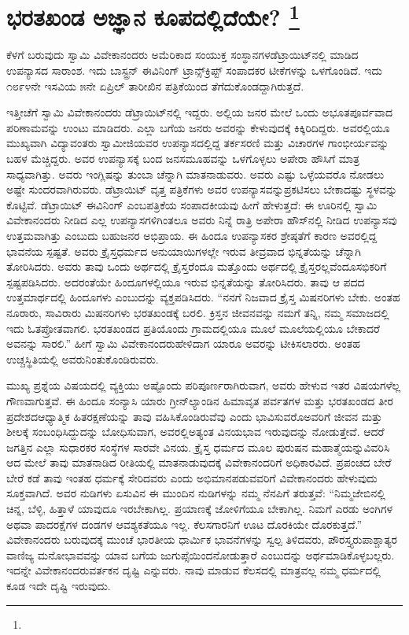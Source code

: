 
\chapter[ಭರತಖಂಡ ಅಜ್ಞಾನ ಕೂಪದಲ್ಲಿದೆಯೇ? ]{ಭರತಖಂಡ ಅಜ್ಞಾನ ಕೂಪದಲ್ಲಿದೆಯೇ? \protect\footnote{}}

ಕೆಳಗೆ ಬರುವುದು ಸ್ವಾಮಿ ವಿವೇಕಾನಂದರು ಅಮೆರಿಕಾದ ಸಂಯುಕ್ತ ಸಂಸ್ಥಾನಗಳ\break ಡೆಟ್ರಾಯಿಟ್​ನಲ್ಲಿ ಮಾಡಿದ ಉಪನ್ಯಾಸದ ಸಾರಾಂಶ. ಇದು ಬಾಸ್ಟ್ರನ್​ ಈವಿನಿಂಗ್​ ಟ್ರಾನ್ಸ್​ಕ್ರಿಪ್ಟ್ ​ಸಂಪಾದಕರ ಟೀಕೆಗಳನ್ನು ಒಳಗೊಂಡಿದೆ. ಇದು ೧೮೯೪ನೇ ಇಸವಿಯ ೫ನೇ ಏಪ್ರಿಲ್​ ತಾರೀಖಿನ ಪತ್ರಿಕೆಯಿಂದ ತೆಗೆದುಕೊಂಡದ್ದಾಗಿರುತ್ತದೆ.

ಇತ್ತೀಚೆಗೆ ಸ್ವಾಮಿ ವಿವೇಕಾನಂದರು ಡೆಟ್ರಾಯಿಟ್​ನಲ್ಲಿ ಇದ್ದರು. ಅಲ್ಲಿಯ ಜನರ ಮೇಲೆ ಒಂದು ಅಭೂತಪೂರ್ವವಾದ ಪರಿಣಾಮವನ್ನು ಉಂಟು ಮಾಡಿದರು. ಎಲ್ಲಾ ಬಗೆಯ ಜನರು ಅವರನ್ನು ಕೇಳುವುದಕ್ಕೆ ಕಿಕ್ಕಿರಿದಿದ್ದರು. ಅವರಲ್ಲಿಯೂ ಮುಖ್ಯವಾಗಿ ವಿದ್ಯಾವಂತರು ಸ್ವಾಮೀಜಿಯವರ ಉಪನ್ಯಾಸದಲ್ಲಿದ್ದ ತರ್ಕಸರಣಿ ಮತ್ತು ವಿಚಾರಗಳ ಗಾಂಭೀರ್ಯವನ್ನು ಬಹಳ ಮೆಚ್ಚಿದ್ದರು. ಅವರ ಉಪನ್ಯಾಸಕ್ಕೆ ಬಂದ ಜನಸಮೂಹವನ್ನು ಒಳಗೊಳ್ಳಲು ಅಪೇರಾ ಹೌಸಿಗೆ ಮಾತ್ರ ಸಾಧ್ಯವಾಗಿತ್ತು. ಅವರು ಇಂಗ್ಲಿಷನ್ನು ತುಂಬಾ ಚೆನ್ನಾಗಿ ಮಾತನಾಡುವರು. ಅವರು ಎಷ್ಟು ಒಳ್ಳೆಯವರೊ ನೋಡಲು ಅಷ್ಟೇ ಸುಂದರವಾಗಿರುವರು. ಡೆಟ್ರಾಯಿಟ್​ ವೃತ್ತ ಪತ್ರಿಕೆಗಳು ಅವರ ಉಪನ್ಯಾಸವನ್ನು\break ಪ್ರಕಟಿಸಲು ಬೇಕಾದಷ್ಟು ಸ್ಥಳವನ್ನು ಕೊಟ್ಟಿವೆ. ಡೆಟ್ರಾಯಿಟ್​ ಈವಿನಿಂಗ್​ ಎಂಬ\break ಪತ್ರಿಕೆಯ ಸಂಪಾದಕೀಯವು ಹೀಗೆ ಹೇಳುತ್ತದೆ: ಈ ಊರಿನಲ್ಲಿ ಸ್ವಾಮಿ ವಿವೇಕಾನಂದರು ನೀಡಿದ ಎಲ್ಲ ಉಪನ್ಯಾಸಗಳಿಗಿಂತಲೂ ಅವರು ನಿನ್ನೆ ರಾತ್ರಿ ಅಪೇರಾ ಹೌಸ್​ನಲ್ಲಿ ನೀಡಿದ ಉಪನ್ಯಾಸವು ಉತ್ತಮವಾಗಿತ್ತು ಎಂಬುದು ಬಹುಜನರ ಅಭಿಪ್ರಾಯ. ಈ ಹಿಂದೂ ಉಪನ್ಯಾಸಕರ ಶ್ರೇಷ್ಠತೆಗೆ ಕಾರಣ ಅವರಲ್ಲಿದ್ದ ಭಾವನೆಯ ಸ್ಪಷ್ಟತೆ. ಅವರು ಕ್ರೈಸ್ತಧರ್ಮದ ಅನುಯಾಯಿಗಳಲ್ಲೇ ಇರುವ ತೀವ್ರವಾದ ಭಿನ್ನತೆಯನ್ನು ಚೆನ್ನಾಗಿ ತೋರಿಸಿದರು. ಅವರು ತಾವು ಒಂದು ಅರ್ಥದಲ್ಲಿ ಕ್ರೈಸ್ತರೆಂದೂ ಮತ್ತೊಂದು ಅರ್ಥದಲ್ಲಿ ಕ್ರೈಸ್ತರಲ್ಲವೆಂದೂ\break ಸಭಿಕರಿಗೆ ಸ್ಪಷ್ಟಪಡಿಸಿದರು. ಅದರಂತೆಯೇ ಹಿಂದೂಗಳಲ್ಲಿಯೂ ಇರುವ ಭಿನ್ನತೆಯನ್ನು ತೋರಿಸಿದರು. ತಾವು ಆ ಪದದ ಉತ್ತಮಾರ್ಥದಲ್ಲಿ ಹಿಂದೂಗಳು ಎಂಬುದನ್ನು ವ್ಯಕ್ತಪಡಿಸಿದರು. “ನನಗೆ ನಿಜವಾದ ಕ್ರೈಸ್ತ ಮಿಷನರಿಗಳು ಬೇಕು. ಅಂತಹ ನೂರಾರು, ಸಾವಿರಾರು ಮಿಷನರಿಗಳು ಭರತಖಂಡಕ್ಕೆ ಬರಲಿ. ಕ್ರಿಸ್ತನ ಜೀವನವನ್ನು ನಮಗೆ ತನ್ನಿ, ನಮ್ಮ ಸಮಾಜದಲ್ಲಿ ಇದು ಓತಪ್ರೋತವಾಗಲಿ. ಭರತಖಂಡದ ಪ್ರತಿಯೊಂದು ಗ್ರಾಮದಲ್ಲಿಯೂ ಮೂಲೆ ಮೂಲೆಯಲ್ಲಿಯೂ ಬೇಕಾದರೆ ಅವನನ್ನು ಸಾರಲಿ.” ಹೀಗೆ ಸ್ವಾಮಿ ವಿವೇಕಾನಂದರು\break ಹೇಳಿದಾಗ ಯಾರೂ ಅವರನ್ನು ಟೀಕಿಸಲಾರರು. ಅಂತಹ ಉಚ್ಚಸ್ಥಿತಿಯಲ್ಲಿ ಅವರು\break ನಿಂತುಕೊಂಡಿರುವರು.

ಮುಖ್ಯ ಪ್ರಶ್ನೆಯ ವಿಷಯದಲ್ಲಿ ವ್ಯಕ್ತಿಯು ಅಷ್ಟೊಂದು ಪರಿಪೂರ್ಣರಾಗಿರುವಾಗ, ಅವರು ಹೇಳುವ ಇತರ ವಿಷಯಗಳೆಲ್ಲ ಗೌಣವಾಗುತ್ತವೆ. ಈ ಹಿಂದೂ ಸಂನ್ಯಾಸಿ ಯಾರು ಗ್ರೀನ್​ಲ್ಯಾಂಡಿನ ಹಿಮಾವೃತ ಪರ್ವತಗಳ ಮತ್ತು ಭರತಖಂಡದ ತೀರ ಪ್ರದೇಶದ\break ಆಧ್ಯಾತ್ಮಿಕ ಹಿತರಕ್ಷಣೆಯನ್ನು ತಾವು ವಹಿಸಿಕೊಂಡಿರುವೆವು ಎಂದು ಭಾವಿಸುವರೊ\break ಅವರಿಗೆ ಜೀವನ ಮತ್ತು ಶೀಲಕ್ಕೆ ಸಂಬಂಧಿಸಿದ್ದುದನ್ನು ಬೋಧಿಸುವಾಗ, ಅವರಲ್ಲಿ\break ಅತ್ಯಂತ ವಿನಯಭಾವ ಇರುವುದನ್ನು ನೋಡುತ್ತೇವೆ. ಆದರೆ ಜಗತ್ತಿನ ಎಲ್ಲಾ ಸುಧಾರಕರ ಸಂಸ್ಥೆಗಳ ಸಾರವೇ ವಿನಯ. ಕ್ರೈಸ್ತ ಧರ್ಮದ ಮೂಲ ಪುರುಷನ ಮಹಾತ್ಮೆಯನ್ನು\break ವಿವರಿಸಿ ಆದ ಮೇಲೆ ತಾವು ಮಾತನಾಡಿದ ರೀತಿಯಲ್ಲಿ ಮಾತನಾಡುವುದಕ್ಕೆ ವಿವೇಕಾನಂದ\-ರಿಗೆ ಅಧಿಕಾರವಿದೆ. ಪ್ರಪಂಚದ ಬೇರೆ ಬೇರೆ ಕಡೆ ತಾವು ಇಂತಹ ಧರ್ಮಕ್ಕೆ ಸೇರಿದವರು ಎಂದು ಅಭಿಮಾನಪಡುವವರಿಗೆ ವಿವೇಕಾನಂದರು ಹೇಳುವುದು ಸೂಕ್ತವಾಗಿದೆ. ಅವರ ನುಡಿಗಳು ಏಸುವಿನ ಈ ಮುಂದಿನ ನುಡಿಗಳನ್ನು ನಮ್ಮ ನೆನಪಿಗೆ ತರುತ್ತವೆ: “ನಿಮ್ಮ\break ಜೇಬಿನಲ್ಲಿ ಚಿನ್ನ, ಬೆಳ್ಳಿ, ಹಿತ್ತಾಳೆ ಯಾವುದೂ ಇರಬೇಕಾಗಿಲ್ಲ. ಪ್ರಯಾಣಕ್ಕೆ ಜೋಳಿಗೆಯೂ ಬೇಕಾಗಿಲ್ಲ. ನಿಮಗೆ ಎರಡು ಅಂಗಿಗಳ ಅಥವಾ ಪಾದರಕ್ಷೆಗಳ ದಂಡಗಳ ಆವಶ್ಯಕತೆಯೂ ಇಲ್ಲ. ಕೆಲಸಗಾರನಿಗೆ ಊಟ ದೊರಕಿಯೇ ದೊರಕುತ್ತದೆ.” ವಿವೇಕಾನಂದರು ಬರುವುದಕ್ಕೆ ಮುಂಚೆ ಭಾರತೀಯ ಧಾರ್ಮಿಕ ಭಾವನೆಗಳನ್ನು ಸ್ವಲ್ಪ ತಿಳಿದವರು, ಪೌರಸ್ತ್ಯರು\break ಪಾಶ್ಚಾತ್ಯರ ವಾಣಿಜ್ಯ ಮನೋಭಾವವನ್ನು ಯಾವ ಬಗೆಯ ಜುಗುಪ್ಸೆಯಿಂದ\break ನೋಡುತ್ತಾರೆ ಎಂಬುದನ್ನು ಅರ್ಥಮಾಡಿಕೊಳ್ಳಬಲ್ಲರು. ಇದನ್ನೇ ವಿವೇಕಾನಂದರು\break ವರ್ತಕನ ದೃಷ್ಟಿ ಎನ್ನುವರು. ನಾವು ಮಾಡುವ ಕೆಲಸದಲ್ಲಿ ಮಾತ್ರವಲ್ಲ ನಮ್ಮ ಧರ್ಮದಲ್ಲಿ ಕೂಡ ಇದೇ ದೃಷ್ಟಿ ಇರುವುದು.


